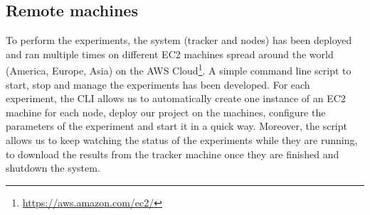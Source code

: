 \subsection{Remote machines}

To perform the experiments, the system (tracker and nodes) has been deployed and ran multiple times on different EC2 machines spread around the world (America, Europe, Asia) on the AWS Cloud\footnote{\url{https://aws.amazon.com/ec2/}}.
A simple command line script to start, stop and manage the experiments has been developed.
For each experiment, the CLI allows us to automatically create one instance of an EC2 machine for each node, deploy our project on the machines, configure the parameters of the experiment and start it in a quick way.
Moreover, the script allows us to keep watching the status of the experiments while they are running, to download the results from the tracker machine once they are finished and shutdown the system.

